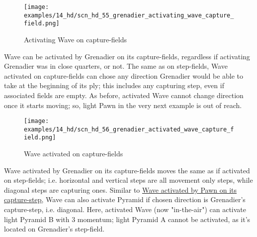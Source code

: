 \clearpage %

\vspace*{-2.1\baselineskip}
\noindent
\begin{figure}[!h]
\texttt{[image: examples/14\_hd/scn\_hd\_55\_grenadier\_activating\_wave\_capture\_field.png]}
\vspace*{-1.4\baselineskip}
\caption{Activating Wave on capture-fields}
\label{fig:scn_hd_55_grenadier_activating_wave_capture_field}
\end{figure}

\vspace*{-0.5\baselineskip}
Wave can be activated by Grenadier on its capture-fields, regardless if activating
Grenadier was in close quarters, or not. The same as on step-fields, Wave activated
on capture-fields can chose any direction Grenadier would be able to take at the
beginning of its ply; this includes any capturing step, even if associated fields
are empty.\newline
\indent
As before, activated Wave cannot change direction once it starts moving; so, light
Pawn in the very next example is out of reach.

\clearpage %

\vspace*{-2.1\baselineskip}
\noindent
\begin{figure}[!h]
\texttt{[image: examples/14\_hd/scn\_hd\_56\_grenadier\_activated\_wave\_capture\_field.png]}
\vspace*{-1.4\baselineskip}
\caption{Wave activated on capture-fields}
\label{fig:scn_hd_56_grenadier_activated_wave_capture_field}
\end{figure}

\vspace*{-0.5\baselineskip}
Wave activated by Grenadier on its capture-fields moves the same as if activated
on step-fields; i.e. horizontal and vertical steps are all movement only steps,
while diagonal steps are capturing ones. Similar to
\hyperref[fig:scn_mv_028_wave_activated_by_capture_pawn]{Wave activated by Pawn on its capture-step},
Wave can also activate Pyramid if chosen direction is Grenadier's capture-step,
i.e. diagonal.\newline
\indent
Here, activated Wave (now "in-the-air") can activate light Pyramid B with 3 momentum;
light Pyramid A cannot be activated, as it's located on Grenadier's step-field.

